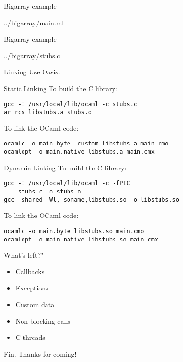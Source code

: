 \documentclass{beamer}
\begin{document}
\begin{frame}[fragile,shrink=5]{Bigarray example}
\begin{lstinputlisting}[language=ML]{../bigarray/main.ml}
\end{lstinputlisting}
\end{frame}

\begin{frame}[fragile,shrink=5]{Bigarray example}
\begin{lstinputlisting}[language=C]{../bigarray/stubs.c}
\end{lstinputlisting}
\end{frame}

\begin{frame}{Linking}
Use Oasis.
\end{frame}

\begin{frame}[fragile]{Static Linking}
To build the C library:
\begin{lstlisting}
gcc -I /usr/local/lib/ocaml -c stubs.c
ar rcs libstubs.a stubs.o
\end{lstlisting}

To link the OCaml code:
\begin{lstlisting}
ocamlc -o main.byte -custom libstubs.a main.cmo
ocamlopt -o main.native libstubs.a main.cmx
\end{lstlisting}
\end{frame}

\begin{frame}[fragile]{Dynamic Linking}
To build the C library:
\begin{lstlisting}
gcc -I /usr/local/lib/ocaml -c -fPIC
    stubs.c -o stubs.o
gcc -shared -Wl,-soname,libstubs.so -o libstubs.so
\end{lstlisting}

To link the OCaml code:
\begin{lstlisting}
ocamlc -o main.byte libstubs.so main.cmo
ocamlopt -o main.native libstubs.so main.cmx
\end{lstlisting}
\end{frame}

\begin{frame}{What's left?"}
\begin{itemize}
    \item Callbacks
    \item Exceptions
    \item Custom data
    \item Non-blocking calls
    \item C threads
\end{itemize}
\end{frame}

\begin{frame}{Fin.}
Thanks for coming!
\end{frame}
\end{document}
